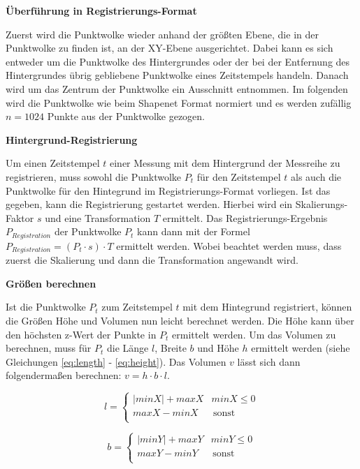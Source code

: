 \documentclass[12pt,titlepage, twoside]{article}
\begin{document}
\textbf{Überführung in Registrierungs-Format }

Zuerst wird die Punktwolke wieder anhand der größten Ebene, die in der Punktwolke zu finden ist, an der XY-Ebene ausgerichtet.
Dabei kann es sich entweder um die Punktwolke des Hintergrundes oder der bei der Entfernung des Hintergrundes übrig gebliebene Punktwolke eines Zeitstempels handeln.
Danach wird um das Zentrum der Punktwolke ein Ausschnitt entnommen. 
Im folgenden wird die Punktwolke wie beim Shapenet Format normiert und es werden zufällig $n=1024$ Punkte aus der Punktwolke gezogen.

\textbf{Hintergrund-Registrierung}

Um einen Zeitstempel $t$ einer Messung mit dem Hintergrund der Messreihe zu registrieren, muss sowohl die Punktwolke $P_t$ für den Zeitstempel $t$ als auch die Punktwolke für den Hintegrund im Registrierungs-Format vorliegen.
Ist das gegeben, kann die Registrierung gestartet werden. Hierbei wird ein Skalierungs-Faktor $s$ und eine Transformation $T$ ermittelt. 
Das Registrierungs-Ergebnis $P_{Registration}$ der Punktwolke $P_t$ kann dann mit der Formel $P_{Registration} = (P_t \cdot s) \cdot T$ ermittelt werden. 
Wobei beachtet werden muss, dass zuerst die Skalierung und dann die Transformation angewandt wird.

\textbf{Größen berechnen}

Ist die Punktwolke $P_t$ zum Zeitstempel $t$ mit dem Hintegrund registriert, können die Größen Höhe und Volumen nun leicht berechnet werden.
Die Höhe kann über den höchsten z-Wert der Punkte in $P_t$ ermittelt werden. Um das Volumen zu berechnen, muss für $P_t$ die Länge $l$, Breite $b$ und Höhe $h$ ermittelt werden (siehe Gleichungen \ref{eq:length} - \ref{eq:height}). 
Das Volumen $v$ lässt sich dann folgendermaßen berechnen: $v = h \cdot b \cdot l$.

\begin{equation}
    \label{eq:length}
    l = \left\{
    \begin{array}{ll}
    |minX| + maxX & minX \leq 0 \\
    maxX - minX & \, \textrm{sonst} \\
    \end{array}
    \right. 
\end{equation}

\begin{equation}
    \label{eq:width}
    b = \left\{
    \begin{array}{ll}
    |minY| + maxY & minY \leq 0 \\
    maxY - minY & \, \textrm{sonst} \\
    \end{array}
    \right. 
\end{equation}
\end{document}
